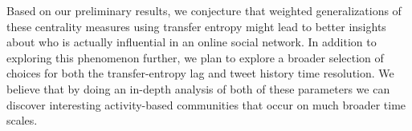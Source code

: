 Based on our preliminary results, we conjecture that weighted generalizations of these centrality measures using transfer entropy might lead to better insights about who is actually influential in an online social network. In addition to exploring this phenomenon further, we plan to explore a broader selection of choices for both the transfer-entropy lag and tweet history time resolution. We believe that by doing an in-depth analysis of both of these parameters we can discover interesting activity-based communities that occur on much broader time scales.















